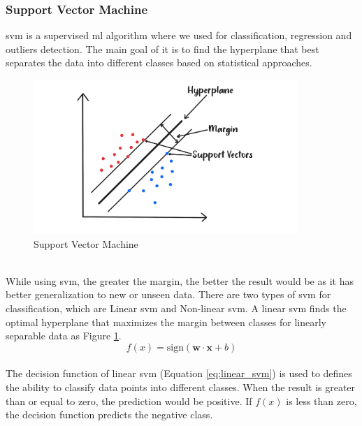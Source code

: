 \subsubsection{Support Vector Machine}
\nocite{berwick_an}
\nocite{_14}
\nocite{saini_2021_support}
\gls{svm} is a supervised \gls{ml} algorithm where we used for classification, regression and outliers detection.
The main goal of it is to find the hyperplane that best separates the data into different classes based on statistical approaches. \citep{gron_2019_handson}
\\
\begin{figure}[!ht]
    \centering
    \includegraphics[width=10cm]{Images/svm.png}
    \caption{Support Vector Machine}
    \label{fig:svm}
\end{figure}
\\
\indent While using \gls{svm}, the greater the margin, the better the result would be as it has better generalization to new or unseen data. 
There are two types of \gls{svm} for classification, which are Linear \gls{svm} and Non-linear \gls{svm}.
A linear \gls{svm} finds the optimal hyperplane that maximizes the margin between classes for linearly separable data as Figure \ref{fig:svm}.
\\
\begin{equation} \label{eq:linear_svm}
    f(x) = \text{sign}(\mathbf{w} \cdot \mathbf{x} + b)
\end{equation}
\\
The decision function of linear \gls{svm} (Equation \ref{eq:linear_svm}) is used to defines the ability to classify data points into different classes.
When the result is greater than or equal to zero, the prediction would be positive. If $f(x)$ is less than zero, the decision function predicts the negative class. 
